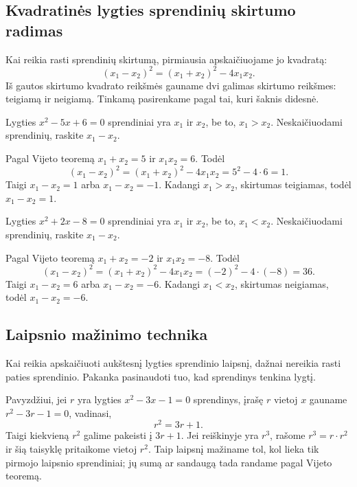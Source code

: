 \documentclass[11pt,a4paper]{scrartcl}
\begin{document}
\subsection{Kvadratinės lygties sprendinių skirtumo radimas}

Kai reikia rasti sprendinių skirtumą, pirmiausia apskaičiuojame jo kvadratą:
\[
(x_1-x_2)^2=(x_1+x_2)^2-4x_1x_2.
\]
Iš gautos skirtumo kvadrato reikšmės gauname dvi galimas skirtumo reikšmes: teigiamą ir neigiamą. Tinkamą pasirenkame pagal tai, kuri šaknis didesnė.

\begin{example}
Lygties $x^2-5x+6=0$ sprendiniai yra $x_1$ ir $x_2$, be to, $x_1>x_2$. Neskaičiuodami sprendinių, raskite $x_1-x_2$.
\end{example}
\begin{solution}
Pagal Vijeto teoremą $x_1+x_2=5$ ir $x_1x_2=6$. Todėl
\[
(x_1-x_2)^2=(x_1+x_2)^2-4x_1x_2=5^2-4\cdot6=1.
\]
Taigi $x_1-x_2=1$ arba $x_1-x_2=-1$. Kadangi $x_1>x_2$, skirtumas teigiamas, todėl $x_1-x_2=1$.
\end{solution}

\begin{example}
Lygties $x^2+2x-8=0$ sprendiniai yra $x_1$ ir $x_2$, be to, $x_1<x_2$. Neskaičiuodami sprendinių, raskite $x_1-x_2$.
\end{example}
\begin{solution}
Pagal Vijeto teoremą $x_1+x_2=-2$ ir $x_1x_2=-8$. Todėl
\[
(x_1-x_2)^2=(x_1+x_2)^2-4x_1x_2=(-2)^2-4\cdot(-8)=36.
\]
Taigi $x_1-x_2=6$ arba $x_1-x_2=-6$. Kadangi $x_1<x_2$, skirtumas neigiamas, todėl $x_1-x_2=-6$.
\end{solution}

\subsection{Laipsnio mažinimo technika}

Kai reikia apskaičiuoti aukštesnį lygties sprendinio laipsnį, dažnai nereikia rasti paties sprendinio. Pakanka pasinaudoti tuo, kad sprendinys tenkina lygtį.

Pavyzdžiui, jei $r$ yra lygties $x^2-3x-1=0$ sprendinys, įrašę $r$ vietoj $x$ gauname $r^2-3r-1=0$, vadinasi,
\[
r^2=3r+1.
\]
Taigi kiekvieną $r^2$ galime pakeisti į $3r+1$. Jei reiškinyje yra $r^3$, rašome $r^3=r\cdot r^2$ ir šią taisyklę pritaikome vietoj $r^2$. Taip laipsnį mažiname tol, kol lieka tik pirmojo laipsnio sprendiniai; jų sumą ar sandaugą tada randame pagal Vijeto teoremą.
\end{document}
